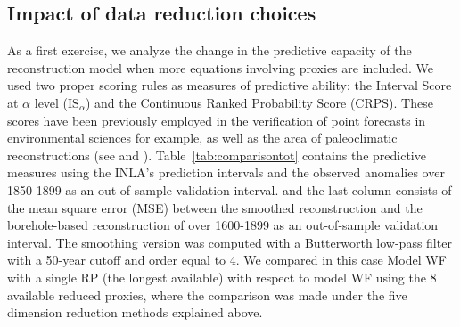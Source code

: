 \documentclass[12pt]{amsart}
\theoremstyle{plain}
\theoremstyle{definition}
\theoremstyle{remark}
\begin{document}
\subsection{Impact of data reduction choices}
As a first exercise, we analyze the change in the predictive capacity of the
reconstruction model when more equations involving proxies are included. We used
two proper scoring rules \cite{Gneiting2007a} as measures of predictive ability: the Interval Score at $\alpha$ level
(IS$_\alpha$) and the Continuous Ranked
Probability Score (CRPS). These scores have been previously employed in the
verification of point forecasts in environmental sciences for example, as well as the area
of paleoclimatic reconstructions (see \cite{Barboza2014} and
\cite{Scheuerer2014}). Table~\ref{tab:comparisontot} contains the predictive
measures using the INLA's prediction intervals and the observed
  anomalies over 1850-1899 as an out-of-sample validation interval.  and the
  last column consists of the mean square error (MSE) between the smoothed
  reconstruction and the borehole-based
reconstruction of \cite{Pollack2004} over 1600-1899 as an out-of-sample
validation interval. The smoothing version was computed with a Butterworth low-pass filter with a 50-year cutoff and order equal to 4. We compared in this case Model WF with a single RP
(the longest available) with respect to model WF using the 8 available reduced
proxies, where the comparison was made under the five dimension reduction
methods explained above.
\end{document}
